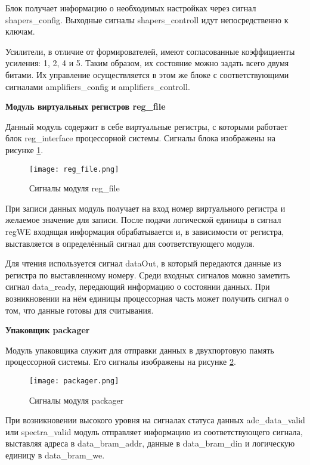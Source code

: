 Блок получает информацию о необходимых настройках через сигнал shapers\_config. Выходные сигналы shapers\_controll идут непосредственно к ключам.\par
Усилители, в отличие от формирователей, имеют согласованные коэффициенты усиления: 1, 2, 4 и 5. Таким образом, их состояние можно задать всего двумя битами. Их управление осуществляется в этом же блоке с соответствующими сигналами amplifiers\_config и amplifiers\_controll.\par
\textbf{Модуль виртуальных регистров reg\_file}\par
Данный модуль содержит в себе виртуальные регистры, с которыми работает блок reg\_interface процессорной системы. Сигналы блока изображены на рисунке \ref{fig:reg_file}. \par
\begin{figure}[ht]
    \centering
    \texttt{[image: reg\_file.png]}
    \caption{Сигналы модуля reg\_file}
    \label{fig:reg_file}
\end{figure}
При записи данных модуль получает на вход номер виртуального регистра и желаемое значение для записи. После подачи логической единицы в сигнал regWE входящая информация обрабатывается и, в зависимости от регистра, выставляется в определённый сигнал для соответствующего модуля.\par
Для чтения используется сигнал dataOut, в который передаются данные из регистра по выставленному номеру. Среди входных сигналов можно заметить сигнал data\_ready, передающий информацию о состоянии данных. При возникновении на нём единицы процессорная часть может получить сигнал о том, что данные готовы для считывания.\par
\textbf{Упаковщик packager}\par
Модуль упаковщика служит для отправки данных в двухпортовую память процессорной системы. Его сигналы изображены на рисунке \ref{fig:packager}.\par 
\begin{figure}[ht]
    \centering
    \texttt{[image: packager.png]}
    \caption{Сигналы модуля packager}
    \label{fig:packager}
\end{figure}
При возникновении высокого уровня на сигналах статуса данных adc\_data\_valid или spectra\_valid модуль отправляет информацию из соответствующего сигнала, выставляя адреса в data\_bram\_addr, данные в data\_bram\_din и логическую единицу в data\_bram\_we.\par
